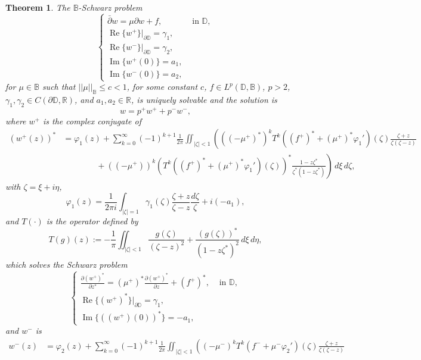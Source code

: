 \documentclass[12pt,reqno]{amsart}
\newtheorem{theorem}{Theorem}[section]
\theoremstyle{definition}
\theoremstyle{remark}
\newcommand{\R}{\mathbb R}
\newcommand{\p}{\partial}
\newcommand{\dbar}{\bar\partial}
\DeclareMathOperator{\im}{Im}
\DeclareMathOperator{\re}{Re}
\newcommand{\bc}{\mathbb{B}}
\newcommand{\disk}{\mathbb{D}}
\begin{document}
\begin{theorem}
    The $\bc$-Schwarz problem 
        \[
            \begin{cases}
                \dbar w = \mu \p w + f, & \text{ in } \disk,\\
                \re\{w^+\}|_{\p\disk} = \gamma_1, \\
                \re\{w^-\}|_{\p\disk} = \gamma_2,\\
                \im\{w^+(0)\} = a_1, \\
                \im\{w^-(0)\} = a_2,
            \end{cases}
        \]
        for $\mu \in \bc$ such that $||\mu||_{\bc} \leq c < 1$, for some constant $c$, $f \in L^p(\disk, \bc)$, $p >2$, $\gamma_1,\gamma_2 \in C(\p \disk,\R)$, and $a_1,a_2 \in \R$, is uniquely solvable and the solution is 
        \[
             w = p^+ w^+ + p^- w^-,
        \]
        where $w^+$ is the complex conjugate of
        \begin{align*}
            (w^+(z))^* 
            &= \varphi_1(z) 
            + \sum_{k=0}^\infty (-1)^{k+1} \frac{1}{2\pi} \iint_{|\zeta|<1} \left( ((-\mu^+)^*)^k T^k((f^+)^*+(\mu^+)^*\varphi_1')(\zeta)\frac{\zeta + z}{\zeta(\zeta -z)} \right.\\
            &\quad\quad\quad\quad +  \left. ((-\mu^+))^k (T^k((f^+)^*+(\mu^+)^*\varphi_1')(\zeta))^*\frac{1-z \zeta^*}{\zeta^*(1-z\zeta^*)} \right)\,d\xi\,d\zeta,
        \end{align*}
        with $\zeta = \xi + i \eta$,
        \[
            \varphi_1(z) = \frac{1}{2\pi i} \int_{|\zeta|=1} \gamma_1(\zeta) \frac{\zeta + z}{\zeta -z} \frac{d\zeta}{\zeta} + i(-a_1),
        \]
        and $T(\cdot)$ is the operator defined by
        \[
            T(g)(z) := -\frac{1}{\pi} \iint_{|\zeta|<1} \frac{g(\zeta)}{(\zeta - z)^2} + \frac{(g(\zeta))^*}{(1-z\zeta^*)^2}\,d\xi\,d\eta,
        \]
        which solves the Schwarz problem
        \[
            \begin{cases}
                \frac{\p (w^+)^*}{\p z^*} = (\mu^+)^* \frac{\p (w^+)^*}{\p z} + (f^+)^*, & \text{ in }\disk,\\
                \re\{(w^+)^*\}|_{\p\disk} = \gamma_1,\\
                \im\{((w^+)(0))^*\} = -a_1,
            \end{cases}
        \]
        and $w^-$ is 
        \begin{align*}
            w^-(z) 
            &= \varphi_2(z) 
            + \sum_{k=0}^\infty (-1)^{k+1} \frac{1}{2\pi} \iint_{|\zeta|<1} \left( (-\mu^-)^k T^k(f^-+\mu^-\varphi_2')(\zeta)\frac{\zeta + z}{\zeta(\zeta -z)} \right.\\

\end{align*}
\end{theorem}
\end{document}
